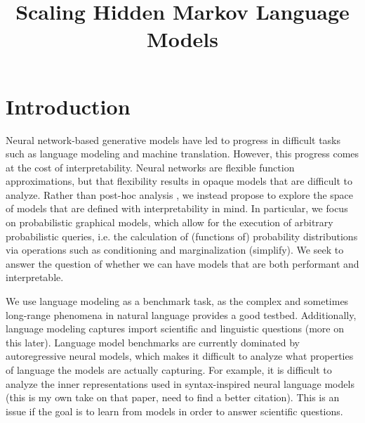 \documentclass{article}
\title{Scaling Hidden Markov Language Models}
\begin{document}
\maketitle


\section{Introduction}
Neural network-based generative models have led to progress in
difficult tasks such as language modeling and machine translation.
However, this progress comes at the cost of interpretability.
Neural networks are flexible function approximations,
but that flexibility results in opaque models that are difficult to analyze.
Rather than post-hoc analysis \citep{tenney2019probing}, we instead propose to explore
the space of models that are defined with interpretability in mind.
In particular, we focus on probabilistic graphical models,
which allow for the execution of arbitrary probabilistic queries,
i.e. the calculation of (functions of) probability distributions
via operations such as conditioning and marginalization \citep{koller2009probabilistic} (simplify).
We seek to answer the question of whether we can have models that are both
performant and interpretable.

We use language modeling as a benchmark task, as the complex 
and sometimes long-range phenomena in natural language provides a good testbed.
Additionally, language modeling captures import scientific and linguistic questions
(more on this later).
Language model benchmarks are currently dominated by autoregressive neural models,
which makes it difficult to analyze what properties of language the models are
actually capturing.
For example, it is difficult to analyze the inner representations used
in syntax-inspired neural language models \citep{du2020exploiting}
(this is my own take on that paper,
need to find a better citation). 
This is an issue if the goal is to learn from models in order to answer
scientific questions.
\end{document}
